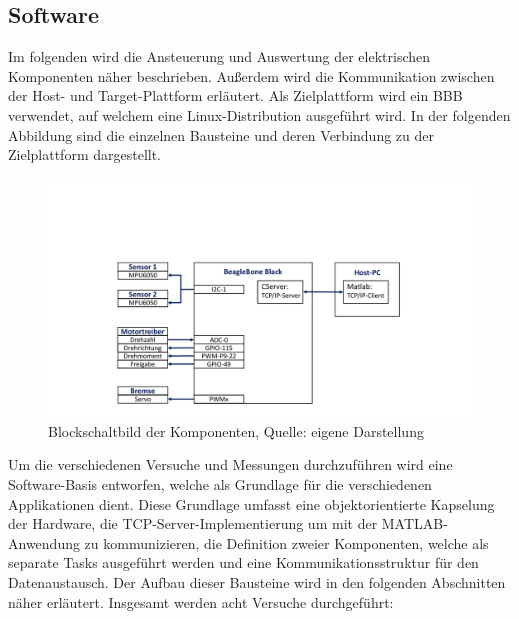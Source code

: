 \subsection{Software}
Im folgenden wird die Ansteuerung und Auswertung der elektrischen Komponenten näher beschrieben. Außerdem wird die Kommunikation zwischen der Host- und Target-Plattform erläutert. Als Zielplattform wird ein \ac{BBB} verwendet, auf welchem eine Linux-Distribution ausgeführt wird. In der folgenden Abbildung sind die einzelnen Bausteine und deren Verbindung zu der Zielplattform dargestellt.

\begin{figure}[!h]
\centering
\includegraphics[width=0.8\linewidth, trim={4cm 1cm 5cm 6cm},clip]{img/ElekAufbau_Kommunikation}
\caption{Blockschaltbild der Komponenten, Quelle: eigene Darstellung}
\end{figure}

Um die verschiedenen Versuche und Messungen durchzuführen wird eine Software-Basis entworfen, welche als Grundlage für die verschiedenen Applikationen dient. Diese Grundlage umfasst eine objektorientierte Kapselung der Hardware, die TCP-Server-Implementierung um mit der MATLAB-Anwendung zu kommunizieren, die Definition zweier Komponenten, welche als separate Tasks ausgeführt werden und eine Kommunikationsstruktur für den Datenaustausch. Der Aufbau dieser Bausteine wird in den folgenden Abschnitten näher erläutert. Insgesamt werden acht Versuche durchgeführt:


